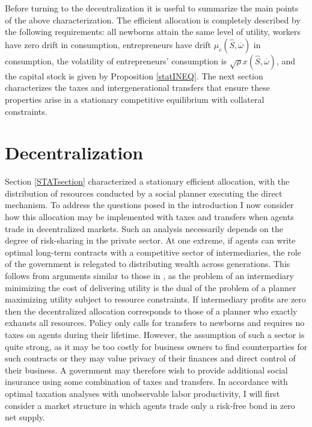 \documentclass[11pt]{article}
\theoremstyle{plain}
\theoremstyle{definition} %
\begin{document}
Before turning to the decentralization it is useful to summarize the main points of the above characterization. The efficient allocation is completely described by the following requirements: all newborns attain the same level of utility, workers have zero drift in consumption, entrepreneurs have drift $\mu_c(\hat{S},\overline{\omega})$ in consumption, the volatility of entrepreneurs' consumption is $\sqrt{\rho} x(\hat{S},\overline{\omega})$, and the capital stock is given by Proposition \ref{statINEQ}. The next section characterizes the taxes and intergenerational transfers that ensure these properties arise in a stationary competitive equilibrium with collateral constraints.  


\section{Decentralization} \label{DecenGenEq}

Section \ref{STATsection} characterized a stationary efficient allocation, with the distribution of resources conducted by a social planner executing the direct mechanism. To address the questions posed in the introduction I now consider how this allocation may be implemented with taxes and transfers when agents trade in decentralized markets. Such an analysis necessarily depends on the degree of risk-sharing in the private sector. At one extreme, if agents can write optimal long-term contracts with a competitive sector of intermediaries, the role of the government is relegated to distributing wealth across generations. This follows from arguments similar to those in \cite{atkeson_efficient_1992}, as the problem of an intermediary minimizing the cost of delivering utility is the dual of the problem of a planner maximizing utility subject to resource constraints. If intermediary profits are zero then the decentralized allocation corresponds to those of a planner who exactly exhausts all resources. Policy only calls for transfers to newborns and requires no taxes on agents during their lifetime. However, the assumption of such a sector is quite strong, as it may be too costly for business owners to find counterparties for such contracts or they may value privacy of their finances and direct control of their business. A government may therefore wish to provide additional social insurance using some combination of taxes and transfers. In accordance with optimal taxation analyses with unobservable labor productivity, I will first consider a market structure in which agents trade only a risk-free bond in zero net supply.
\end{document}
